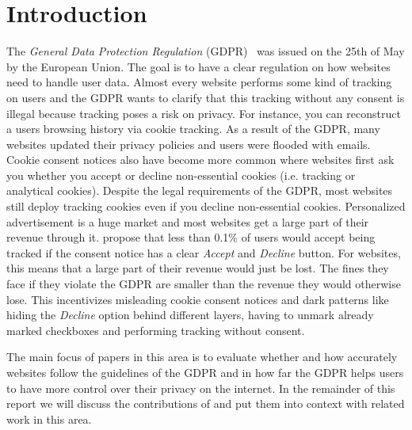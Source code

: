 \section{Introduction}
\label{sec:intro}

The \emph{General Data Protection Regulation} (GDPR)~\cite{EUdataregulations2018} was issued on the 25th of May by the European Union. The goal is to
have a clear regulation on how websites need to handle user data. Almost every website performs some kind of tracking on
users and the GDPR wants to clarify that this tracking without any consent is illegal because tracking poses a risk on
privacy. For instance, you can reconstruct a users browsing history via cookie tracking. As a result of the GDPR, many
websites updated their privacy policies and users were flooded with emails. Cookie consent notices also have become more
common where websites first ask you whether you accept or decline non-essential cookies (i.e. tracking or analytical
cookies). Despite the legal requirements of the GDPR, most websites still deploy tracking cookies even if you decline
non-essential cookies. Personalized advertisement is a huge market and most websites get a large
part of their revenue through it.  propose that less than 0.1\% of users
would accept being tracked if the consent notice has a clear \emph{Accept} and \emph{Decline} button. For websites, this
means that a large part of their revenue would just be lost. The fines they face if they violate the GDPR are smaller
than the revenue they would otherwise lose. This incentivizes misleading cookie consent notices and dark patterns like
hiding the \emph{Decline} option behind different layers, having to unmark already marked checkboxes and performing
tracking without consent.

The main focus of papers in this area is to evaluate whether and how accurately websites follow the guidelines of the
GDPR and in how far the GDPR helps users to have more control over their privacy on the internet.
In the remainder of this report we will discuss the contributions of  and put them into context
with related work in this area.

